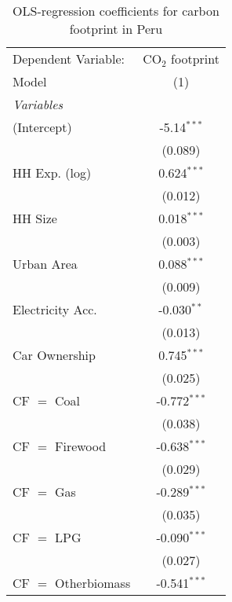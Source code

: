 
\begin{table}[htbp!]
   \centering
   \small
   \begin{adjustbox}{width = 1\textwidth, max height = 0.95\textheight, center}
      \begin{threeparttable}[b]
         \caption{\label{tab:OLS_2_PER} OLS-regression coefficients for carbon footprint in Peru}
         \begin{tabular}{lc}
            \tabularnewline \midrule \midrule
            Dependent Variable: & CO$_{2}$ footprint\\  
            Model               & (1)\\  
            \midrule
            \emph{Variables}\\
            (Intercept)         & -5.14$^{***}$\\   
                                & (0.089)\\   
            HH Exp. (log)       & 0.624$^{***}$\\   
                                & (0.012)\\   
            HH Size             & 0.018$^{***}$\\   
                                & (0.003)\\   
            Urban Area          & 0.088$^{***}$\\   
                                & (0.009)\\   
            Electricity Acc.    & -0.030$^{**}$\\   
                                & (0.013)\\   
            Car Ownership       & 0.745$^{***}$\\   
                                & (0.025)\\   
            CF $=$ Coal         & -0.772$^{***}$\\   
                                & (0.038)\\   
            CF $=$ Firewood     & -0.638$^{***}$\\   
                                & (0.029)\\   
            CF $=$ Gas          & -0.289$^{***}$\\   
                                & (0.035)\\   
            CF $=$ LPG          & -0.090$^{***}$\\   
                                & (0.027)\\   
            CF $=$ Otherbiomass & -0.541$^{***}$\\   

\end{tabular}
\end{threeparttable}
\end{adjustbox}
\end{table}
